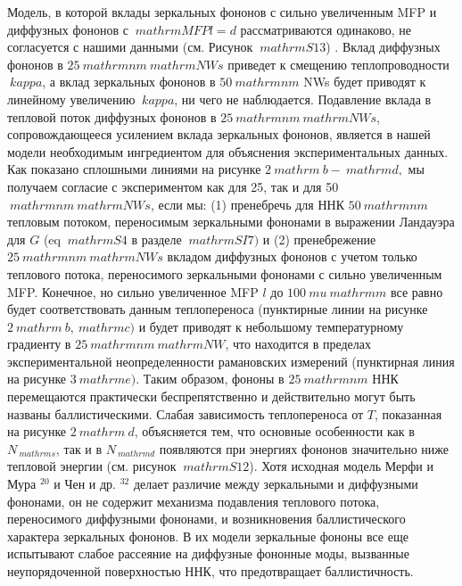 \documentclass[a4paper, 12pt]{article}%
\begin{document}
Модель, в которой вклады зеркальных фононов с сильно увеличенным MFP и диффузных фононов с $ \ mathrm {MFP} l = d $ рассматриваются одинаково, не согласуется с нашими данными (см. Рисунок $ \ mathrm {S} 13 $) . Вклад диффузных фононов в $ 25 \ mathrm {nm} \ mathrm {NWs} $ приведет к смещению теплопроводности $ \ kappa $, а вклад зеркальных фононов в $ 50 \ mathrm {nm} $ NWs будет приводят к линейному увеличению $ \ kappa $, ни чего не наблюдается. Подавление вклада в тепловой поток диффузных фононов в $ 25 \ mathrm {nm} \ mathrm {NWs} $, сопровождающееся усилением вклада зеркальных фононов, является в нашей модели необходимым ингредиентом для объяснения экспериментальных данных. Как показано сплошными линиями на рисунке $ 2 \ mathrm {~ b} - \ mathrm {d}, $ мы получаем согласие с экспериментом как для 25, так и для 50 $ \ mathrm {nm} \ mathrm {NWs} $, если мы:
(1) пренебречь для ННК $ 50 \ mathrm {nm} $ тепловым потоком, переносимым зеркальными фононами в выражении Ландауэра для $ G $ (eq $ \ mathrm {S} 4 $ в разделе $ \ mathrm {SI} 7) $ и (2) пренебрежение $ 25 \ mathrm {nm} \ mathrm {NWs} $ вкладом диффузных фононов с учетом только теплового потока, переносимого зеркальными фононами с сильно увеличенным MFP. Конечное, но сильно увеличенное MFP $ l $ до $ 100 \ mu \ mathrm {m} $ все равно будет соответствовать данным теплопереноса (пунктирные линии на рисунке $ 2 \ mathrm {~ b}, \ mathrm {c}) $ и будет приводят к небольшому температурному градиенту в $ 25 \ mathrm {nm} \ mathrm {NW} $, что находится в пределах экспериментальной неопределенности рамановских измерений (пунктирная линия на рисунке $ 3 \ mathrm {e}) $. Таким образом, фононы в $ 25 \ mathrm {nm} $ ННК перемещаются практически беспрепятственно и действительно могут быть названы баллистическими. Слабая зависимость теплопереноса от $ T $, показанная на рисунке $ 2 \ mathrm {~ d} $, объясняется тем, что основные особенности как в $ N _ {\ mathrm {s}} $, так и в $ N _ {\ mathrm {d }} $ появляются при энергиях фононов значительно ниже тепловой энергии (см. рисунок $ \ mathrm {S} 12 $). Хотя исходная модель Мерфи и Мура $ ^ {20} $ и Чен и др. $ {} ^ {32} $ делает различие между зеркальными и диффузными фононами, он не содержит механизма подавления теплового потока, переносимого диффузными фононами, и возникновения баллистического характера зеркальных фононов. В их модели зеркальные фононы все еще испытывают слабое рассеяние на диффузные фононные моды, вызванные неупорядоченной поверхностью ННК, что предотвращает баллистичность.
\end{document}
